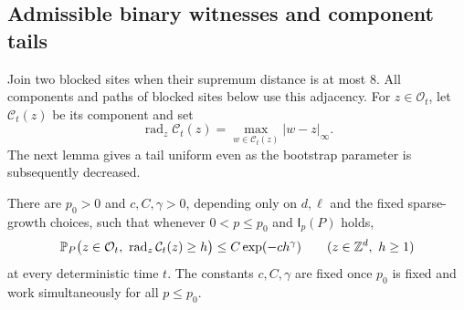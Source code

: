 \subsection{Admissible binary witnesses and component tails}

Join two blocked sites when their supremum distance is at most \(8\).
All components and paths of blocked sites below use this adjacency.
For \(z\in\mathcal O_t\), let \(\mathcal C_t(z)\) be its component
and set
\[
 \operatorname{rad}_z\mathcal C_t(z)
 =\max_{w\in\mathcal C_t(z)}|w-z|_\infty.
\]
The next lemma gives a tail uniform even as the bootstrap parameter is
subsequently decreased.

\begin{lemma}\label{lem:component-tail}
There are \(p_0>0\) and \(c,C,\gamma>0\), depending only on
\(d,\ell\) and the fixed sparse-growth choices, such that whenever
\(0<p\le p_0\) and \(\mathsf I_p(P)\) holds,
\begin{equation}\label{eq:component-tail}
 \mathbb P_P\bigl(z\in\mathcal O_t,\
      \operatorname{rad}_z\mathcal C_t(z)\ge h\bigr)
 \le C\exp(-ch^\gamma)
 \qquad(z\in\mathbb Z^d,\ h\ge1)
\end{equation}
at every deterministic time \(t\).  The constants \(c,C,\gamma\)
are fixed once \(p_0\) is fixed and work simultaneously for all
\(p\le p_0\).
\end{lemma}

